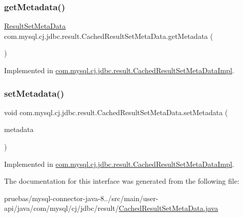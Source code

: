 \subsubsection{\texorpdfstring{get\+Metadata()}{getMetadata()}}
{\footnotesize\ttfamily \mbox{\hyperlink{classcom_1_1mysql_1_1cj_1_1jdbc_1_1result_1_1_result_set_meta_data}{Result\+Set\+Meta\+Data}} com.\+mysql.\+cj.\+jdbc.\+result.\+Cached\+Result\+Set\+Meta\+Data.\+get\+Metadata (\begin{DoxyParamCaption}{ }\end{DoxyParamCaption})}



Implemented in \mbox{\hyperlink{classcom_1_1mysql_1_1cj_1_1jdbc_1_1result_1_1_cached_result_set_meta_data_impl_ad340a766600a4dd265fcd87df0e85b78}{com.\+mysql.\+cj.\+jdbc.\+result.\+Cached\+Result\+Set\+Meta\+Data\+Impl}}.

\mbox{\label{interfacecom_1_1mysql_1_1cj_1_1jdbc_1_1result_1_1_cached_result_set_meta_data_a29872cda6030096e51fc2397fa3b7135}} 
\subsubsection{\texorpdfstring{set\+Metadata()}{setMetadata()}}
{\footnotesize\ttfamily void com.\+mysql.\+cj.\+jdbc.\+result.\+Cached\+Result\+Set\+Meta\+Data.\+set\+Metadata (\begin{DoxyParamCaption}\item[{java.\+sql.\+Result\+Set\+Meta\+Data}]{metadata }\end{DoxyParamCaption})}



Implemented in \mbox{\hyperlink{classcom_1_1mysql_1_1cj_1_1jdbc_1_1result_1_1_cached_result_set_meta_data_impl_ae5fdc22b3e94b8fd950721c1c8fea867}{com.\+mysql.\+cj.\+jdbc.\+result.\+Cached\+Result\+Set\+Meta\+Data\+Impl}}.



The documentation for this interface was generated from the following file\+:\begin{DoxyCompactItemize}
\item 
pruebas/mysql-\/connector-\/java-\/8../src/main/user-\/api/java/com/mysql/cj/jdbc/result/\mbox{\hyperlink{_cached_result_set_meta_data_8java}{Cached\+Result\+Set\+Meta\+Data.\+java}}\end{DoxyCompactItemize}
